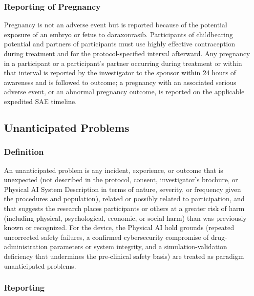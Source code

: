 \subsubsection{Reporting of Pregnancy}

Pregnancy is not an adverse event but is reported because of the potential exposure
of an embryo or fetus to daraxonrasib. Participants of childbearing potential and
partners of participants must use highly effective contraception during treatment
and for the protocol-specified interval afterward. Any pregnancy in a participant or
a participant's partner occurring during treatment or within that interval is
reported by the investigator to the sponsor within 24 hours of awareness and is
followed to outcome; a pregnancy with an associated serious adverse event, or an
abnormal pregnancy outcome, is reported on the applicable expedited SAE timeline.

\subsection{Unanticipated Problems}

\subsubsection{Definition}

An unanticipated problem is any incident, experience, or outcome that is unexpected
(not described in the protocol, consent, investigator's brochure, or Physical AI
System Description in terms of nature, severity, or frequency given the procedures
and population), related or possibly related to participation, and that suggests the
research places participants or others at a greater risk of harm (including physical,
psychological, economic, or social harm) than was previously known or recognized. For
the device, the Physical AI hold grounds (repeated uncorrected safety failures, a
confirmed cybersecurity compromise of drug-administration parameters or system
integrity, and a simulation-validation deficiency that undermines the pre-clinical
safety basis) are treated as paradigm unanticipated problems.

\subsubsection{Reporting}

